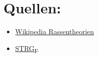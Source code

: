 \documentclass{article}
\begin{document}
\section{Quellen:}
\label{sec:orgda16c7a}

\begin{itemize}
\item \href{https://de.wikipedia.org/wiki/Rassentheorie}{Wikipedia Rassentheorien}
\item \href{https://www.google.com/url?sa=t\&rct=j\&q=\&esrc=s\&source=web\&cd=\&cad=rja\&uact=8\&ved=2ahUKEwjfz8yZ1NH0AhWhRPEDHd0XCAYQtwJ6BAgJEAI\&url=https\%3A\%2F\%2Fwww.youtube.com\%2Fwatch\%3Fv\%3Dj3r-I3NdECY\&usg=AOvVaw11swcHe5mttEqKwMTYtROv}{STRG\textsubscript{F}}
\end{itemize}
\end{document}
